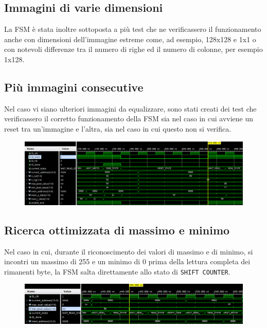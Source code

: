 \documentclass[11pt]{article}
\begin{document}
    \subsection{Immagini di varie dimensioni}
    
        La FSM è stata inoltre sottoposta a più test che ne verificassero il funzionamento anche con dimensioni dell'immagine estreme come, ad esempio, 128x128 e 1x1 o con notevoli differenze tra il numero di righe ed il numero di colonne, per esempio 1x128.
        
    \subsection{Più immagini consecutive}
    
        Nel caso vi siano ulteriori immagini da equalizzare, sono stati creati dei test che verificassero il corretto funzionamento della FSM sia nel caso in cui avviene un reset tra un'immagine e l'altra, sia nel caso in cui questo non si verifica.
        
        \begin{figure}[h]
            \centering
            \includegraphics[width=\textwidth]{tb_multiple_no_reset.png}
        \end{figure}
        
    
    
    \subsection{Ricerca ottimizzata di massimo e minimo}
    
        Nel caso in cui, durante il riconoscimento dei valori di massimo e di minimo, si incontri un massimo di 255 e un minimo di 0 prima della lettura completa dei rimanenti byte, la FSM salta direttamente allo stato di \texttt{SHIFT COUNTER}.
    
        \begin{figure}[h]
            \centering
            \includegraphics[width=\textwidth]{tb_fast_max_min.png}
        \end{figure}
        
\end{document}
